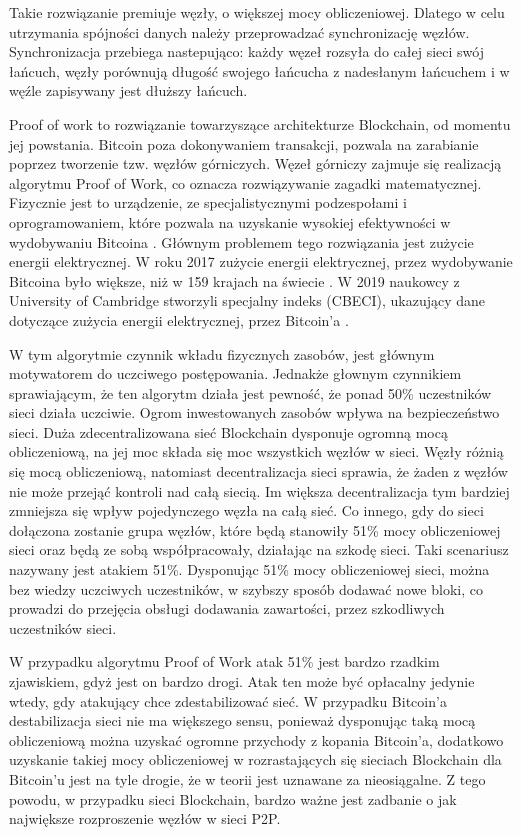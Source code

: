 \documentclass[a4paper,13pt]{report}
\begin{document}
Takie rozwiązanie premiuje węzły, o większej mocy obliczeniowej. Dlatego w celu utrzymania spójności danych należy przeprowadzać synchronizację węzłów. Synchronizacja przebiega nastepująco: każdy węzeł rozsyła do całej sieci swój łańcuch, węzły porównują długość swojego łańcucha z nadesłanym łańcuchem i w węźle zapisywany jest dłuższy łańcuch. 

Proof of work to rozwiązanie towarzyszące architekturze Blockchain, od momentu jej powstania. Bitcoin poza dokonywaniem transakcji, pozwala na zarabianie poprzez tworzenie tzw. węzłów górniczych. Węzeł górniczy zajmuje się realizacją algorytmu Proof of Work, co oznacza rozwiązywanie zagadki matematycznej. Fizycznie jest to urządzenie, ze specjalistycznymi podzespołami i oprogramowaniem, które pozwala na uzyskanie wysokiej efektywności w wydobywaniu Bitcoina \cite{nodes}. Głównym problemem tego rozwiązania jest zużycie energii elektrycznej. W roku 2017 zużycie energii elektrycznej, przez wydobywanie Bitcoina było większe, niż w 159 krajach na świecie \cite{elctricity-bitcoin}. W 2019 naukowcy z University of Cambridge stworzyli specjalny indeks (CBECI), ukazujący dane dotyczące zużycia energii elektrycznej, przez Bitcoin'a \cite{CBECI}.

W tym algorytmie czynnik wkładu fizycznych zasobów, jest głównym motywatorem do uczciwego postępowania. Jednakże głownym czynnikiem sprawiającym, że ten algorytm działa jest pewność, że ponad 50\% uczestników sieci działa uczciwie. Ogrom inwestowanych zasobów wpływa na bezpieczeństwo sieci. Duża zdecentralizowana sieć Blockchain dysponuje ogromną mocą obliczeniową, na jej moc składa się moc wszystkich węzłów w sieci. Węzły różnią się mocą obliczeniową, natomiast decentralizacja sieci sprawia, że żaden z węzłów nie może przejąć kontroli nad całą siecią. Im większa decentralizacja tym bardziej zmniejsza się wpływ pojedynczego węzła na całą sieć. Co innego, gdy do sieci dołączona zostanie grupa węzłów, które będą stanowiły 51\% mocy obliczeniowej sieci oraz będą ze sobą współpracowały, działając na szkodę sieci. Taki scenariusz nazywany jest atakiem 51\%. Dysponując 51\% mocy obliczeniowej sieci, można bez wiedzy uczciwych uczestników, w szybszy sposób dodawać nowe bloki, co prowadzi do przejęcia obsługi dodawania zawartości, przez szkodliwych uczestników siec\cite{atack51}i.

W przypadku algorytmu Proof of Work atak 51\% jest bardzo rzadkim zjawiskiem, gdyż jest on bardzo drogi. Atak ten może być opłacalny jedynie wtedy, gdy atakujący chce zdestabilizować sieć. W przypadku Bitcoin'a destabilizacja sieci nie ma większego sensu, ponieważ dysponując taką mocą obliczeniową można uzyskać ogromne przychody z kopania Bitcoin'a, dodatkowo uzyskanie takiej mocy obliczeniowej w rozrastających się sieciach Blockchain dla Bitcoin'u jest na tyle drogie, że w teorii jest uznawane za nieosiągalne. Z tego powodu, w przypadku sieci Blockchain, bardzo ważne jest zadbanie o jak największe rozproszenie węzłów w sieci P2P.
\end{document}

